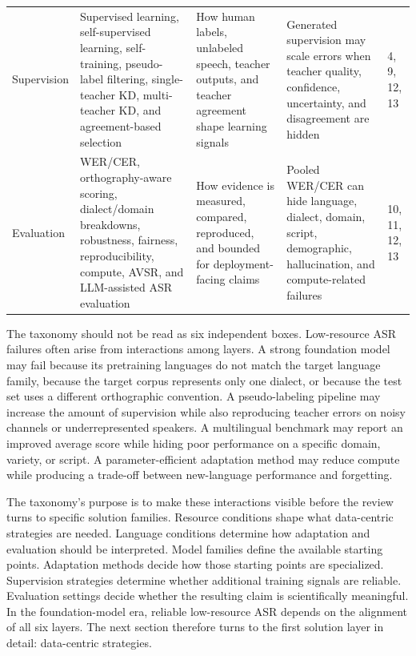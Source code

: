 \documentclass[pdflatex,sn-basic,iicol]{sn-jnl}
\theoremstyle{thmstyleone}
\theoremstyle{thmstyletwo}
\theoremstyle{thmstylethree}
\begin{document}
\begin{table}[htbp]
\begin{tabularx}{\textwidth}{YYYYY}
Supervision & Supervised learning, self-supervised learning, self-training, pseudo-label filtering, single-teacher KD, multi-teacher KD, and agreement-based selection & How human labels, unlabeled speech, teacher outputs, and teacher agreement shape learning signals & Generated supervision may scale errors when teacher quality, confidence, uncertainty, and disagreement are hidden & 4, 9, 12, 13 \\
Evaluation & WER/CER, orthography-aware scoring, dialect/domain breakdowns, robustness, fairness, reproducibility, compute, AVSR, and LLM-assisted ASR evaluation & How evidence is measured, compared, reproduced, and bounded for deployment-facing claims & Pooled WER/CER can hide language, dialect, domain, script, demographic, hallucination, and compute-related failures & 10, 11, 12, 13 \\
\bottomrule
\end{tabularx}
\end{table}

The taxonomy should not be read as six independent boxes. Low-resource ASR failures often arise from interactions among layers. A strong foundation model may fail because its pretraining languages do not match the target language family, because the target corpus represents only one dialect, or because the test set uses a different orthographic convention. A pseudo-labeling pipeline may increase the amount of supervision while also reproducing teacher errors on noisy channels or underrepresented speakers. A multilingual benchmark may report an improved average score while hiding poor performance on a specific domain, variety, or script. A parameter-efficient adaptation method may reduce compute while producing a trade-off between new-language performance and forgetting.

The taxonomy's purpose is to make these interactions visible before the review turns to specific solution families. Resource conditions shape what data-centric strategies are needed. Language conditions determine how adaptation and evaluation should be interpreted. Model families define the available starting points. Adaptation methods decide how those starting points are specialized. Supervision strategies determine whether additional training signals are reliable. Evaluation settings decide whether the resulting claim is scientifically meaningful. In the foundation-model era, reliable low-resource ASR depends on the alignment of all six layers. The next section therefore turns to the first solution layer in detail: data-centric strategies.
\end{document}
